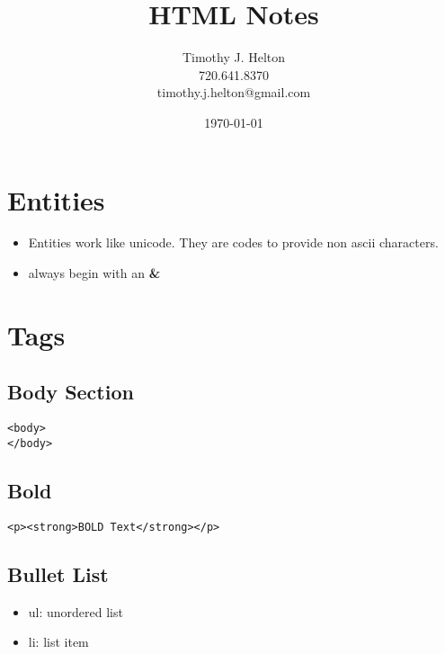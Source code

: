 \documentclass{article}
\newcommand{\mytitle}{HTML Notes}
\begin{document}
\author{Timothy J. Helton\\720.641.8370\\timothy.j.helton@gmail.com}
\date{\today}
\title{\mytitle}

\maketitle
\newpage

\tableofcontents
\newpage

\listoffigures
\listoftables
\newpage

\section{Entities}
\begin{itemize}
  \item Entities work like unicode. They are codes to provide non ascii
        characters.
  \item always begin with an \textbf{\&}
\end{itemize}

\section{Tags}

\subsection{Body Section}
\begin{lstlisting}
<body>
</body>
\end{lstlisting}

\subsection{Bold}
\begin{lstlisting}
<p><strong>BOLD Text</strong></p>
\end{lstlisting}

\subsection{Bullet List}
\begin{itemize}
  \item ul: unordered list
  \item li: list item
\end{itemize}
\end{document}
